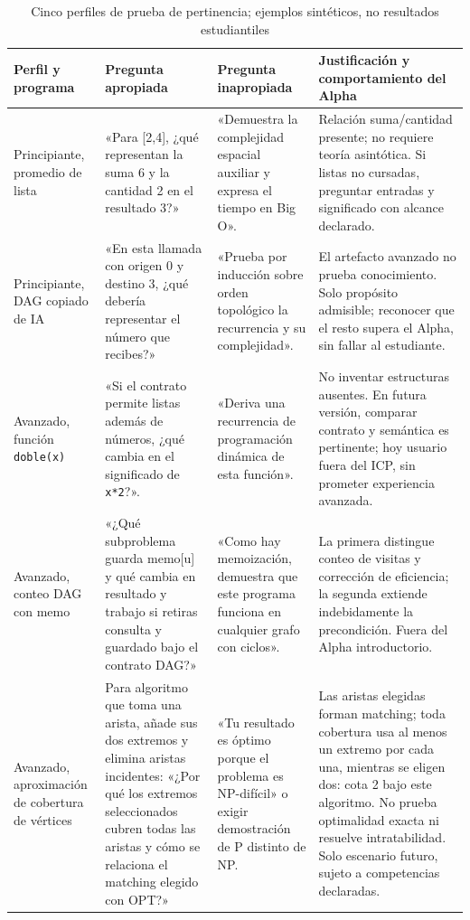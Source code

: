 \documentclass[11pt,a4paper]{report}
\begin{document}
\begin{landscape}
\small
\begin{longtable}{P{3.6cm}P{6.4cm}P{6cm}P{7.2cm}}
\caption{Cinco perfiles de prueba de pertinencia; ejemplos sintéticos, no resultados estudiantiles}\\
\toprule Perfil y programa & Pregunta apropiada & Pregunta inapropiada & Justificación y comportamiento del Alpha \\\midrule\endhead
Principiante, promedio de lista & «Para [2,4], ¿qué representan la suma 6 y la cantidad 2 en el resultado 3?» & «Demuestra la complejidad espacial auxiliar y expresa el tiempo en Big O». & Relación suma/cantidad presente; no requiere teoría asintótica. Si listas no cursadas, preguntar entradas y significado con alcance declarado.\\
Principiante, DAG copiado de IA & «En esta llamada con origen 0 y destino 3, ¿qué debería representar el número que recibes?» & «Prueba por inducción sobre orden topológico la recurrencia y su complejidad». & El artefacto avanzado no prueba conocimiento. Solo propósito admisible; reconocer que el resto supera el Alpha, sin fallar al estudiante.\\
Avanzado, función \texttt{doble(x)} & «Si el contrato permite listas además de números, ¿qué cambia en el significado de \texttt{x*2}?». & «Deriva una recurrencia de programación dinámica de esta función». & No inventar estructuras ausentes. En futura versión, comparar contrato y semántica es pertinente; hoy usuario fuera del ICP, sin prometer experiencia avanzada.\\
Avanzado, conteo DAG con memo & «¿Qué subproblema guarda memo[u] y qué cambia en resultado y trabajo si retiras consulta y guardado bajo el contrato DAG?» & «Como hay memoización, demuestra que este programa funciona en cualquier grafo con ciclos». & La primera distingue conteo de visitas y corrección de eficiencia; la segunda extiende indebidamente la precondición. Fuera del Alpha introductorio.\\
Avanzado, aproximación de cobertura de vértices & Para algoritmo que toma una arista, añade sus dos extremos y elimina aristas incidentes: «¿Por qué los extremos seleccionados cubren todas las aristas y cómo se relaciona el matching elegido con OPT?» & «Tu resultado es óptimo porque el problema es NP-difícil» o exigir demostración de P distinto de NP. & Las aristas elegidas forman matching; toda cobertura usa al menos un extremo por cada una, mientras se eligen dos: cota 2 bajo este algoritmo. No prueba optimalidad exacta ni resuelve intratabilidad. Solo escenario futuro, sujeto a competencias declaradas.\\\bottomrule
\end{longtable}
\end{landscape}
\end{document}
